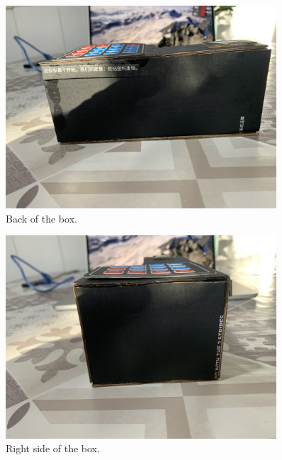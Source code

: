 \documentclass{article}
\begin{document}
\begin{figure}[!h]
  \centering
  \vspace*{\fill}
  \includegraphics[width=0.9\textwidth]{BackView.jpg}
  \caption{Back of the box.}
  \vspace*{\fill}
\end{figure}

\newpage

\begin{figure}[!h]
  \centering
  \vspace*{\fill}
  \includegraphics[width=0.9\textwidth]{RightSideView.jpg}
  \caption{Right side of the box.}
  \vspace*{\fill}
\end{figure}

\newpage
\end{document}
